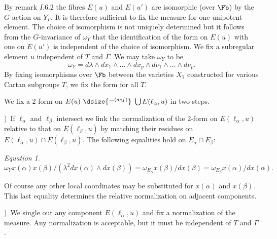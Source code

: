 \documentclass{memo-l}
\theoremstyle{definition}
\theoremstyle{remark}
\newtheorem{eqn}[theorem]{Equation}
\numberwithin{section}{chapter}
\numberwithin{equation}{chapter}
\begin{document}
   By remark $I.6.2$ the fibres $E(u)$ and $E(u')$ are isomorphic (over
$\Fb$) by the $G$-action on $Y_{{\Gamma}}$.  It is therefore sufficient
to fix the measure for one unipotent element.  The choice of isomorphism is
not uniquely determined but it follows from the $G$-invariance of
${\omega}_{Y}$ that the identification of the form on $E(u)$ with one on
$E(u')$ is independent of the choice of isomorphism.  We fix a subregular
element $u$ independent of $T$ and ${\Gamma}$.  We may take ${\omega}_{Y}$
to be
$$
{\omega}_{Y}  =  d{\lambda}\wedge dx_{1}\wedge \ldots \wedge dx_{p}\wedge
d{\nu}_{1}\wedge \ldots \wedge d{\nu}_{p}.
$$
By fixing isomorphisms over $\Fb$ between the varieties $X_{1}$
constructed for various Cartan subgroups $T$, we fix the form for all $T$.
 

   We fix a $2$-form on $E(u)\ {\dsize{\mathrel{\mathop=^{(def)}}}}\ 
\bigcup E({\ell}_{{\alpha}},u)$ in two steps.

\medskip
{})\ If ${\ell}_{{\alpha}}$ and ${\ell}_{{\beta}}$ intersect we link the
normalization of the $2$-form on $E({\ell}_{{\alpha}},u)$ relative to that
on $E({\ell}_{{\beta}},u)$ by matching their residues on
$E({\ell}_{{\alpha}},u) \cap E({\ell}_{{\beta}},u)$.  The following
equalities hold on $E_{{\alpha}} \cap E_{{\beta}}$:

\begin{eqn} %
$$
{\omega}_{Y}x({\alpha})x({\beta})/({\lambda}^{2}dx({\alpha})\wedge
dx({\beta}))  =  {\omega}_{E_\alpha} x({\beta})/dx({\beta})  = 
{\omega}_{E_\beta} x({\alpha})/dx({\alpha}) .
$$
\end{eqn}

\noindent Of course any other local coordinates may be substituted for $x({\alpha})$
and $x({\beta})$.  This last equality determines the relative normalization
on adjacent components.

\medskip
{})\ We single out any component $E({\ell}_{{\alpha}},u)$ and fix a
normalization of the measure.  Any normalization is acceptable, but it must
be independent of $T$ and ${\Gamma}$.
\end{document}
